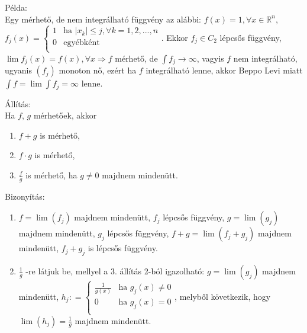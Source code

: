 \documentclass[12pt,a4paper]{scrartcl}
\providecommand{\tightlist}{%
  \setlength{\itemsep}{0pt}\setlength{\parskip}{0pt}}
\newenvironment{bizonyitas}{}{}
\newenvironment{allitas}{}{}
\newenvironment{pelda}{}{}
\begin{document}
\begin{pelda}

Példa:\\
Egy mérhető, de nem integrálható függvény az alábbi:
\(f\left( x \right) = 1,\forall x \in {\mathbb{R}}^{n}\),
\(f_{j}\left( x \right) = \left\{ \begin{matrix} 1 & {\text{ha~}\left| x_{k} \right| \leq j,\forall k = 1,2,...,n} \\ 0 & \text{egyébként} \\ \end{matrix} \right.\).
Ekkor \(f_{j} \in C_{2}\) lépcsős függvény,
\(\left. \lim f_{j}\left( x \right) = f\left( x \right),\forall x\Rightarrow f \right.\)
mérhető, de \(\left. {\int f_{j}}\rightarrow\infty \right.\), vagyis
\(f\) nem integrálható, ugyanis \(\left( f_{j} \right)\) monoton nő,
ezért ha \(f\) integrálható lenne, akkor Beppo Levi miatt
\({\int f} = \lim{\int f_{j}} = \infty\) lenne.

\end{pelda}

\begin{allitas}

Állítás:\\
Ha \(f\), \(g\) mérhetőek, akkor

\begin{enumerate}
\def\labelenumi{\arabic{enumi}.}
\tightlist
\item
  \(f + g\) is mérhető,
\item
  \(f \cdot g\) is mérhető,
\item
  \(\frac{f}{g}\) is mérhető, ha \(g \neq 0\) majdnem mindenütt.
\end{enumerate}

\end{allitas}

\begin{bizonyitas}

Bizonyítás:

\begin{enumerate}
\def\labelenumi{\arabic{enumi}.}
\tightlist
\item
  \(f = \lim\left( f_{j} \right)\) majdnem mindenütt, \(f_{j}\) lépcsős
  függvény, \(g = \lim\left( g_{j} \right)\) majdnem mindenütt,
  \(g_{j}\) lépcsős függvény,
  \(f + g = \lim\left( {f_{j} + g_{j}} \right)\) majdnem mindenütt,
  \(f_{j} + g_{j}\) is lépcsős függvény.
\item
  \(\frac{1}{g}\) -re látjuk be, mellyel a 3. állítás 2-ból igazolható:
  \(g = \lim\left( g_{j} \right)\) majdnem mindenütt,
  \(h_{j}: = \left\{ \begin{matrix} \frac{1}{g\left( x \right)} & {\text{ha~}g_{j}\left( x \right) \neq 0} \\ 0 & {\text{ha~}g_{j}\left( x \right) = 0} \\ \end{matrix} \right.\),
  melyből következik, hogy \(\lim\left( h_{j} \right) = \frac{1}{g}\)
  majdnem mindenütt.
\end{enumerate}

\end{bizonyitas}
\end{document}

